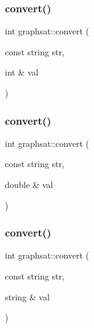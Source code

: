 \subsubsection{\texorpdfstring{convert()}{convert()}\hspace{0.1cm}{\footnotesize\ttfamily [2/4]}}
{\footnotesize\ttfamily int graphsat\+::convert (\begin{DoxyParamCaption}\item[{const string}]{str,  }\item[{int \&}]{val }\end{DoxyParamCaption})}

\mbox{\label{namespacegraphsat_a1e3a9de4e4dbde53a4ba0a16c401c70e}} 
\subsubsection{\texorpdfstring{convert()}{convert()}\hspace{0.1cm}{\footnotesize\ttfamily [3/4]}}
{\footnotesize\ttfamily int graphsat\+::convert (\begin{DoxyParamCaption}\item[{const string}]{str,  }\item[{double \&}]{val }\end{DoxyParamCaption})}

\mbox{\label{namespacegraphsat_a5e9a43b1f7e9427b049a52876cd47e12}} 
\subsubsection{\texorpdfstring{convert()}{convert()}\hspace{0.1cm}{\footnotesize\ttfamily [4/4]}}
{\footnotesize\ttfamily int graphsat\+::convert (\begin{DoxyParamCaption}\item[{const string}]{str,  }\item[{string \&}]{val }\end{DoxyParamCaption})}

\mbox{\label{namespacegraphsat_aa2e41cce8a2ffcf08ed66f25228a21f3}} 
